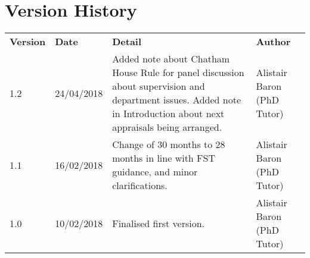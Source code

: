 \documentclass[12pt,a4paper]{article}
\begin{document}
\section{Version History}
\begin{tabularx}{\textwidth}{llXX}
	\textbf{Version} & \textbf{Date} & \textbf{Detail} & \textbf{Author} \\ 
	1.2	& 24/04/2018 & Added note about Chatham House Rule for panel discussion about supervision and department issues. Added note in Introduction about next appraisals being arranged. & Alistair Baron (PhD Tutor) \\
	1.1	& 16/02/2018 & Change of 30 months to 28 months in line with FST guidance, and minor clarifications. & Alistair Baron (PhD Tutor) \\
	1.0 & 10/02/2018 & Finalised first version. & Alistair Baron (PhD Tutor) \\ 
\end{tabularx} 
\end{document}

